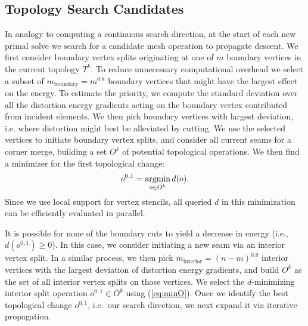 \subsection{Topology Search Candidates}
\label{sec:descent_op}
In analogy to computing a continuous search direction, at the start of each new primal solve we search for a candidate mesh operation to propagate descent. 
%
We first consider boundary vertex splits originating at one of $m$ boundary vertices in the current topology $T^k$. 
To reduce unnecessary computational overhead we select a subset of $m_\text{boundary}=m^{0.8}$ boundary vertices that might have the largest effect on the energy. To estimate the priority, we compute the standard deviation over all the distortion energy gradients acting on the boundary vertex contributed from incident elements. We then pick boundary vertices with largest deviation, i.e. where distortion might best be alleviated by cutting. We use the selected vertices to initiate boundary vertex splits, and consider all current seams for a corner merge, building a set $O^k$ of potential topological operations.
%
We then find a minimizer for the first topological change:
\begin{align}
\label{eq:minO}
o^{0,1} = \operatorname*{argmin}_{o \in O^k} d(o).
\end{align}
Since we use local support for vertex stencils, all queried $d$ in this minimization can be efficiently evaluated in parallel. 

It is possible for none of the boundary cuts to yield a decrease in energy (i.e., $d(o^{0,1}) \geq 0$).  In this case, we consider initiating a new seam via an interior vertex split. In a similar process, we then pick $m_\text{interior}=(n-m)^{0.8}$ interior vertices with the largest deviation of distortion energy gradients, and build  $O^k$ as the set of all interior vertex splits on those vertices. We select the $d$-minimizing interior split operation $o^{0,1} \in O^k$ using (\ref{eq:minO}). Once we identify the best topological change $o^{0,1}$, i.e.\ our search direction, we next expand it via iterative propagation. 

%

